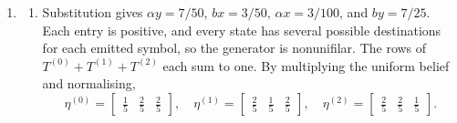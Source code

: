 \documentclass[11pt]{article}
\begin{document}
\begin{solution}[ex:p3-3]
\begin{enumerate}
\begin{enumerate}
          \item The automaton begins
            \[
              \eta^{(1)}\xrightarrow{\,0\,}\eta^{(10)}
              \xrightarrow{\,0\,}\eta^{(100)}
              \xrightarrow{\,0\,}\eta^{(1000)}
              \xrightarrow{\,0\,}\cdots,
            \]
            and every $\eta^{(10^n)}$ with $n\geq1$ has a $1$-transition
            back to $\eta^{(1)}$. Since the first coordinate
            $1/(n+1)$ is different for each $n$, the beliefs are distinct, and
            \[
              \lim_{n\to\infty}\eta^{(10^n)}
                =\begin{bmatrix}0&1\end{bmatrix}.
            \]
            This limiting belief is not reached after any finite history.
            Hence the two hidden generator states induce countably infinitely
            many reachable beliefs.
        \end{enumerate}

      \item
        \begin{enumerate}
          \item Substitution gives
            $\alpha y=7/50$, $bx=3/50$, $\alpha x=3/100$, and
            $by=7/25$. Each entry is positive, and every state has several
            possible destinations for each emitted symbol, so the generator
            is nonunifilar. The rows of $T^{(0)}+T^{(1)}+T^{(2)}$ each sum to
            one. By multiplying the uniform belief and normalising,
            \[
              \eta^{(0)}=\begin{bmatrix}\tfrac15&\tfrac25&\tfrac25\end{bmatrix},
              \quad
              \eta^{(1)}=\begin{bmatrix}\tfrac25&\tfrac15&\tfrac25\end{bmatrix},
              \quad
              \eta^{(2)}=\begin{bmatrix}\tfrac25&\tfrac25&\tfrac15\end{bmatrix}.
            \]


\end{enumerate}
\end{enumerate}
\end{solution}
\end{document}
